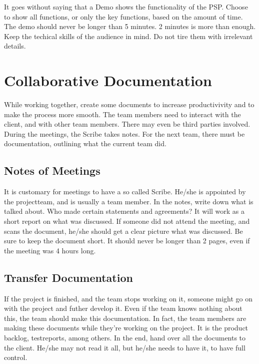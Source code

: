 \documentclass[10pt]{report}
\begin{document}
It goes without saying that a Demo shows the functionality of the PSP. Choose to show all functions, or only the key functions, based on the amount of time. The demo should never be longer than 5 minutes. 2 minutes is more than enough. Keep the techical skills of the audience in mind. Do not tire them with irrelevant details.

\newpage

\chapter{Collaborative Documentation}
\thispagestyle{fancy}

While working together, create some documents to increase productivivity and to make the process more smooth. The team members need to interact with the client, and with other team members. There may even be third parties involved. During the meetings, the Scribe takes notes. For the next team, there must be documentation, outlining what the current team did.

\medskip
\minitoc

\newpage

\section{Notes of Meetings}

It is customary for meetings to have a so called Scribe. He/she is appointed by the projectteam, and is usually a team member. In the notes, write down what is talked about. Who made certain statements and agreements? It will work as a short report on what was discussed. If someone did not attend the meeting, and scans the document, he/she should get a clear picture what was discussed. Be sure to keep the document short. It should never be longer than 2 pages, even if the meeting was 4 hours long.

\newpage

\section{Transfer Documentation}

If the project is finished, and the team stops working on it, someone might go on with the project and futher develop it. Even if the team knows nothing about this, the team should make this documentation. In fact, the team members are making these documents while they're working on the project. It is the product backlog, testreports, among others. In the end, hand over all the documents to the client. He/she may not read it all, but he/she needs to have it, to have full control. 
\end{document}
